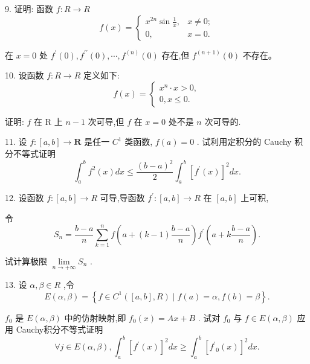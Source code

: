 9. 证明: 函数 $f : R \rightarrow  R$
$$f\left( x\right)  = \left\{  \begin{array}{ll} {x}^{2n}\sin \frac{1}{x}, & x \neq  0; \\  0, & x = 0. \end{array}\right.$$

在 $x = 0$ 处 ${f}^{\prime }\left( 0\right) ,{f}^{\prime \prime }\left( 0\right) ,\cdots ,{f}^{\left( n\right) }\left( 0\right)$ 存在,但 ${f}^{\left( n + 1\right) }\left( 0\right)$ 不存在。

10. 设函数 $f : R \rightarrow  R$ 定义如下:
$$f\left( x\right)  = \left\{  \begin{array}{l} {x}^{n} \cdot  x > 0, \\  0,x \leq  0. \end{array}\right.$$

证明: $f$ 在 $\mathrm{R}$ 上 $n - 1$ 次可导,但 $f$ 在 $x = 0$ 处不是 $n$ 次可导的.

11. 设 $f : \left\lbrack  {a,b}\right\rbrack   \rightarrow  \mathbf{R}$ 是任一 ${C}^{1}$ 类函数, $f\left( a\right)  = 0$ . 试利用定积分的 Cauchy 积分不等式证明
$${\int }_{a}^{b}{f}^{2}\left( x\right) {dx} \leq  \frac{{\left( b - a\right) }^{2}}{2}{\int }_{a}^{b}{\left\lbrack  {f}^{\prime }\left( x\right) \right\rbrack  }^{2}{dx}.$$

12. 设函数 $f : \left\lbrack  {a,b}\right\rbrack   \rightarrow  R$ 可导,导函数 ${f}^{\prime } : \left\lbrack  {a,b}\right\rbrack   \rightarrow  R$ 在 $\left\lbrack  {a,b}\right\rbrack$ 上可积,

令
$${S}_{n} = \frac{b - a}{n}\mathop{\sum }\limits_{{k = 1}}^{n}f\left( {a + \left( {k - 1}\right) \frac{b - a}{n}}\right) {f}^{\prime }\left( {a + k\frac{b - a}{n}}\right) .$$

试计算极限 $\mathop{\lim }\limits_{{n \rightarrow   + \infty }}{S}_{n}$ .

13. 设 $\alpha ,\beta  \in  R$ ,令
$$E\left( {\alpha ,\beta }\right)  = \left\{  {f \in  {C}^{1}\left( {\left\lbrack  {a,b}\right\rbrack  ,R}\right)  \mid  f\left( a\right)  = \alpha ,f\left( b\right)  = \beta }\right\}  .$$

${f}_{0}$ 是 $E\left( {\alpha ,\beta }\right)$ 中的仿射映射,即 ${f}_{0}\left( x\right)  = {Ax} + B$ . 试对 ${f}_{0}$ 与 $f \in  E\left( {\alpha ,\beta }\right)$ 应用 Cauchy积分不等式证明
$$\forall j \in  E\left( {\alpha ,\beta }\right) ,{\int }_{a}^{b}{\left\lbrack  {f}^{\prime }\left( x\right) \right\rbrack  }^{2}{dx} \geq  {\int }_{a}^{b}{\left\lbrack  {f}^{\prime }{}_{0}\left( x\right) \right\rbrack  }^{2}{dx}.$$

